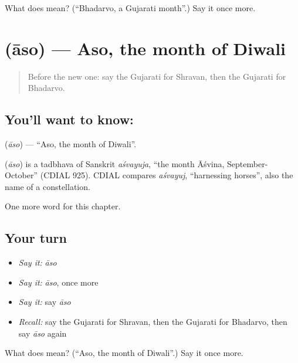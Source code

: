 \begin{tcolorbox}[breakable,colback=teal!4,colframe=teal!35!black,title={Before you move on}]
What does  mean? (\textquotedblleft{}Bhadarvo, a Gujarati month\textquotedblright{}.) Say it once more.
\end{tcolorbox}
\section[\texorpdfstring{\gu{આસો} (āso)}{આસો (āso)}]{ (āso) — Aso, the month of Diwali}

\label{lesson:GU-C98-aso}



\begin{quote}
Before the new one: say the Gujarati for Shravan, then the Gujarati for Bhadarvo.
\end{quote}

\subsection*{You'll want to know: }
\textbf{} (\emph{āso}) — \textquotedblleft{}Aso, the month of Diwali\textquotedblright{}.

\begin{cousinweb}
\textbf{} (\emph{āso}) is a tadbhava of Sanskrit \emph{aśvayuja}, \textquotedblleft{}the month Āśvina, September-October\textquotedblright{} (CDIAL 925). CDIAL compares \emph{aśvayuj}, \textquotedblleft{}harnessing horses\textquotedblright{}, also the name of a constellation.
\end{cousinweb}

\begin{grammarlens}[title={What you've built}]
One more word for this chapter.
\end{grammarlens}

\subsection*{Your turn}
\begin{itemize}
\raggedright
  \item \emph{Say it:} \emph{āso}
  \item \emph{Say it:} \emph{āso}, once more
  \item \emph{Say it:} say \emph{āso}
  \item \emph{Recall:} say the Gujarati for Shravan, then the Gujarati for Bhadarvo, then say \emph{āso} again
\end{itemize}

\begin{tcolorbox}[breakable,colback=teal!4,colframe=teal!35!black,title={Before you move on}]
What does  mean? (\textquotedblleft{}Aso, the month of Diwali\textquotedblright{}.) Say it once more.
\end{tcolorbox}
